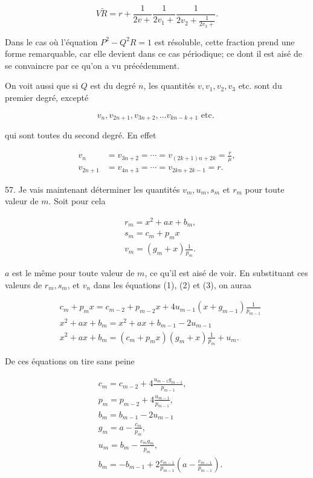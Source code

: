 \documentclass{article}
\begin{document}
\[
V \tilde{R}=r+\frac{1}{2 v+} \frac{1}{2 v_{1}+} \frac{1}{2 v_{2}+\frac{1}{2 v_{3}+}} .
\]

Dans le cas où l'équation \(P^{2}-Q^{2} R=1\) est résoluble, cette fraction prend une forme remarquable, car elle devient dans ce cas périodique; ce dont il est aisé de se convaincre par ce qu'on a vu précédemment.

On voit aussi que si \(Q\) est du degré \(n\), les quantités \(v, v_{1}, v_{2}, v_{3}\) etc. sont du premier degré, excepté

\[
v_{n}, v_{2 n+1}, v_{3 n+2}, \ldots v_{k n-k+1} \text { etc. }
\]

qui sont toutes du second degré. En effet

\[
\begin{aligned}
v_{n} & =v_{3 n+2}=\cdots=v_{(2 k+1) n+2 k}=\frac{r}{\mu}, \\
v_{2 n+1} & =v_{4 n+3}=\cdots=v_{2 k n+2 k-1}=r .
\end{aligned}
\]

57. Je vais maintenant déterminer les quantités \(v_{m}, u_{m}, s_{m}\) et \(r_{m}\) pour toute valeur de \(m\). Soit pour cela

\[
\begin{aligned}
& r_{m}=x^{2}+a x+b_{m}, \\
& s_{m}=c_{m}+p_{m} x \\
& v_{m}=\left(g_{m}+x\right) \frac{1}{p_{m}} .
\end{aligned}
\]

\(a\) est le même pour toute valeur de \(m\), ce qu'il est aisé de voir. En substituant ces valeurs de \(r_{m}, s_{m}\), et \(v_{n}\) dans les équations (1), (2) et (3), on auraa

\[
\begin{aligned}
& c_{m}+p_{m} x=c_{m-2}+p_{m-2} x+4 u_{m-1}\left(x+g_{m-1}\right) \frac{1}{p_{m-1}} \\
& x^{2}+a x+b_{m}=x^{2}+a x+b_{m-1}-2 u_{m-1} \\
& x^{2}+a x+b_{m}=\left(c_{m}+p_{m} x\right)\left(g_{m}+x\right) \frac{1}{p_{m}}+u_{m} .
\end{aligned}
\]

De ces équations on tire sans peine

\[
\begin{aligned}
& c_{m}=c_{m-2}+4 \frac{u_{m-1} g_{m-1}}{p_{m-1}}, \\
& p_{m}=p_{m-2}+4 \frac{u_{m-1}}{p_{m-1}}, \\
& b_{m}=b_{m-1}-2 u_{m-1} \\
& g_{m}=a-\frac{c_{m}}{p_{m}}, \\
& u_{m}=b_{m}-\frac{c_{m} g_{m}}{p_{m}}, \\
& b_{m}=-b_{m-1}+2 \frac{c_{m-1}}{p_{m-1}}\left(a-\frac{c_{m-1}}{p_{m-1}}\right) .
\end{aligned}
\]
\end{document}
